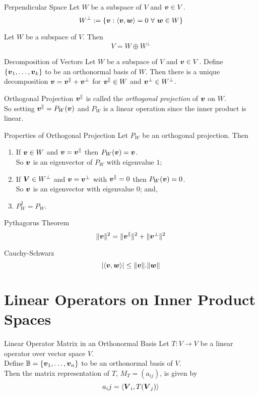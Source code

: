 \documentclass[11pt,a4paper]{article}
\begin{document}
\subtitle{Defintion 9.16 - }{Perpendicular Space}
Let $W$ be a subspace of $V$ and $\boldsymbol{v} \in V$.
$$W^{\bot} := \{\boldsymbol{v} : \langle \boldsymbol{v}, \boldsymbol{w} \rangle = 0\ \forall\ \boldsymbol{w} \in W\}$$

\subtitle{Theorem 9.17}{}
Let $W$ be a subspace of $V$. Then
$$V = W \oplus W^{\bot}$$

\subtitle{Proposition 9.17 - }{Decomposition of Vectors}
Let $W$ be a subspace of $V$ and $\boldsymbol{v} \in V$.
Define $\{\boldsymbol{v}_1, \dots , \boldsymbol{v}_k\}$ to be an orthonormal basis of $W$.
Then there is a unique decomposition $\boldsymbol{v} = \boldsymbol{v}^{\|} + \boldsymbol{v}^{\bot}$ for $\boldsymbol{v}^{\|} \in W$ and $\boldsymbol{v}^{\bot} \in W^{\bot}$.\\

\subtitle{Remark 9.18 - }{Orthogonal Projection}
$\boldsymbol{v}^{\|}$ is called the \textit{orthogonal projection} of $\boldsymbol{v}$ on $W$.\\
So setting $\boldsymbol{v}^{\|} = P_W(\boldsymbol{v})$ and $P_W$ is a linear operation since the inner product is linear.\\

\subtitle{Theorem 9.19 - }{Properties of Orthogonal Projection}
Let $P_W$ be an orthogonal projection. Then
\begin{enumerate}[label=\roman*)]
  \item If $\boldsymbol{v} \in W$ and $\boldsymbol{v} = \boldsymbol{v}^{\|}$ then $P_W(\boldsymbol{v}) = \boldsymbol{v}$.\\
  So $\boldsymbol{v}$ is an eigenvector of $P_W$ with eigenvalue $1$;
  \item If $\boldsymbol{V} \in W^{\bot}$ and $\boldsymbol{v} = \boldsymbol{v}^{\bot}$ with $\boldsymbol{v}^{\|} = 0$ then $P_W(\boldsymbol{v}) = 0$.\\
  So $\boldsymbol{v}$ is an eigenvector with eigenvalue 0; and,
  \item $P_W^2 = P_W$.
\end{enumerate}

\subtitle{Theorem 9.20 - }{Pythagorus Theorem}
$$\|\boldsymbol{v}\|^2 = \|\boldsymbol{v}^{\|}\|^2 + \|\boldsymbol{v}^{\bot}\|^2$$

\subtitle{Theorem 9.21 - }{Cauchy-Schwarz}
$$|\langle \boldsymbol{v}, \boldsymbol{w} \rangle | \leq \|\boldsymbol{v}\|.\|\boldsymbol{w}\|$$

\section{Linear Operators on Inner Product Spaces}

\subtitle{Theorem 10.01 - }{Linear Operator Matrix in an Orthonormal Basis}
Let $T : V \to V$ be a linear operator over vector space $V$.\\
Define $\mathbb{B} = \{\boldsymbol{v}_1 , \dots , \boldsymbol{v}_n\}$ to be an orthonormal basis of $V$.\\
Then the matrix representation of $T$, $M_T = (a_{ij})$, is given by
$$a_ij = \langle \boldsymbol{V}_i, T(\boldsymbol{V}_j) \rangle$$
\end{document}
